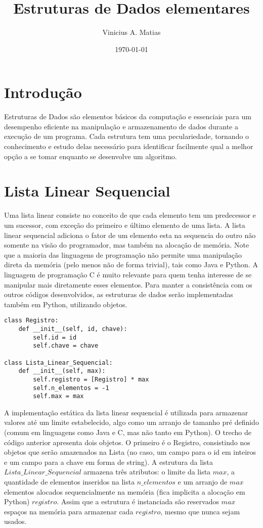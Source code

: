 \documentclass[a4paper, twocolumn]{article}
\title{Estruturas de Dados elementares}
\author{Vinicius A. Matias}
\date{\today}
\theoremstyle{definition}
\begin{document}
	\maketitle
	
	\section{Introdução}
	Estruturas de Dados são elementos básicos da computação e essenciais para um desempenho eficiente na manipulação e armazenamento de dados durante a execução de um programa. Cada estrutura tem uma peculariedade, tornando o conhecimento e estudo delas necessário para identificar facilmente qual a melhor opção a se tomar enquanto se desenvolve um algoritmo.
	
	\section{Lista Linear Sequencial}
	Uma lista linear consiste no conceito de que cada elemento tem um predecessor e um sucessor, com exceção do primeiro e último elemento de uma lista. A lista linear sequencial adiciona o fator de um elemento esta na sequencia do outro não somente na visão do programador, mas também na alocação de memória. Note que a maioria das linguagens de programação não permite uma manipulação direta da memória (pelo menos não de forma trivial), tais como Java e Python. A linguagem de programação C é muito relevante para quem tenha interesse de se manipular mais diretamente esses elementos. Para manter a consistência com os outros códigos desenvolvidos, as estruturas de dados serão implementadas também em Python, utilizando objetos.
	
\begin{lstlisting}[label=lista_linear_seq,caption= Lista linear sequencial (estrutura)]
class Registro:
    def __init__(self, id, chave):
        self.id = id
        self.chave = chave

class Lista_Linear_Sequencial:
    def __init__(self, max):
        self.registro = [Registro] * max
        self.n_elementos = -1
        self.max = max
\end{lstlisting}
	
A implementação estática da lista linear sequencial é utilizada para armazenar valores até um limite estabelecido, algo como um arranjo de tamanho pré definido (comum em linguagens como Java e C, mas não tanto em Python). O trecho de código anterior apresenta dois objetos. O primeiro é o Registro, consistindo nos objetos que serão amazenados na Lista (no caso, um campo para o id em inteiros e um campo para a chave em forma de string). A estrutura da lista $Lista\_Linear\_Sequencial$ armazena três atributos: o limite da lista $max$, a quantidade de elementos inseridos na lista $n\_elementos$ e um arranjo de $max$ elementos alocados sequencialmente na memória (fica implicita a alocação em Python) $registro$. Assim que a estrutura é instanciada são reservados $max$ espaços na memória para armazenar cada $registro$, mesmo que nunca sejam usados.
\end{document}
